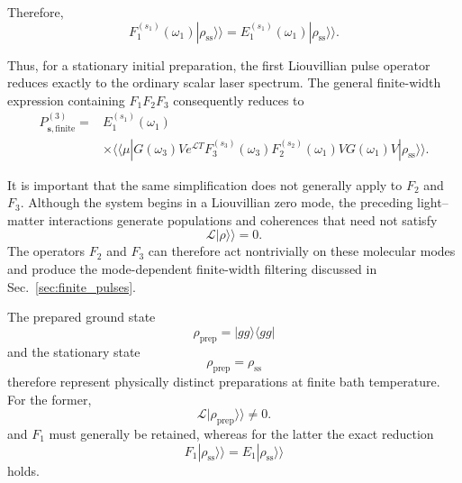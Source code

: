 \documentclass[11pt]{article}
\begin{document}
Therefore,
%
\begin{equation}
\boxed{
F_1^{(s_1)}(\omega_1)
|\rho_{\mathrm{ss}}\rangle\rangle
=
E_1^{(s_1)}(\omega_1)
|\rho_{\mathrm{ss}}\rangle\rangle .
}
\label{eq:dimer_F1_stationary}
\end{equation}

Thus, for a stationary initial preparation, the first Liouvillian
pulse operator reduces exactly to the ordinary scalar laser spectrum.
The general finite-width expression containing
$F_1F_2F_3$ consequently reduces to
%
\begin{equation}
\boxed{
\begin{aligned}
P_{\mathbf{s},\mathrm{finite}}^{(3)}
={}&
E_1^{(s_1)}(\omega_1)
\\
&\times
\langle\!\langle\mu|
G(\omega_3)
V
e^{\mathcal{L}T}
F_3^{(s_3)}(\omega_3)
F_2^{(s_2)}(\omega_1)
V
G(\omega_1)
V
|\rho_{\mathrm{ss}}\rangle\rangle .
\end{aligned}
}
\label{eq:dimer_finite_stationary}
\end{equation}

It is important that the same simplification does not generally apply
to $F_2$ and $F_3$. Although the system begins in a Liouvillian zero
mode, the preceding light--matter interactions generate populations
and coherences that need not satisfy
%
\begin{equation}
\mathcal{L}
|\rho\rangle\rangle
=
0.
\end{equation}
%
The operators $F_2$ and $F_3$ can therefore act nontrivially on these
molecular modes and produce the mode-dependent finite-width filtering
discussed in Sec.~\ref{sec:finite_pulses}.

The prepared ground state
%
\begin{equation}
\rho_{\mathrm{prep}}
=
|gg\rangle\langle gg|
\end{equation}
%
and the stationary state
%
\begin{equation}
\rho_{\mathrm{prep}}
=
\rho_{\mathrm{ss}}
\end{equation}
%
therefore represent physically distinct preparations at finite bath
temperature. For the former,
%
\begin{equation}
\mathcal{L}
|\rho_{\mathrm{prep}}\rangle\rangle
\neq0.
\end{equation}
%
and $F_1$ must generally be retained, whereas for the latter the exact
reduction
%
\begin{equation}
F_1|\rho_{\mathrm{ss}}\rangle\rangle
=
E_1|\rho_{\mathrm{ss}}\rangle\rangle
\end{equation}
%
holds.
\end{document}
